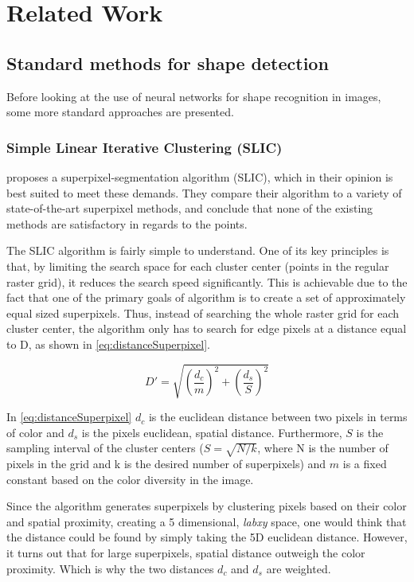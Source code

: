 \chapter{Related Work}

\section{Standard methods for shape detection}
Before looking at the use of neural networks for shape recognition in images, some more standard approaches are presented.

\subsection{Simple Linear Iterative Clustering (SLIC)}
\cite{Achanta2012} proposes a superpixel-segmentation algorithm (SLIC), which in their opinion is best suited to meet these demands. They compare their algorithm to a variety of state-of-the-art superpixel methods, and conclude that none of the existing methods are satisfactory in regards to the points.

The SLIC algorithm is fairly simple to understand. One of its key principles is that, by limiting the search space for each cluster center (points in the regular raster grid), it reduces the search speed significantly. This is achievable due to the fact that one of the primary goals of algorithm is to create a set of approximately equal sized superpixels. Thus, instead of searching the whole raster grid for each cluster center, the algorithm only has to search for edge pixels at a distance equal to D, as shown in \autoref{eq:distanceSuperpixel}.

\begin{equation}
	D'=\sqrt{\left(\frac{d_{c}}{m}\right)^{2} + \left(\frac{d_{s}}{S}\right)^{2}}
	\label{eq:distanceSuperpixel}
\end{equation}

In \autoref{eq:distanceSuperpixel} $d_{c}$ is the euclidean distance between two pixels in terms of color and $d_{s}$ is the pixels euclidean, spatial distance. Furthermore, $S$ is the sampling interval of the cluster centers ($S = \sqrt{N/k}$, where N is the number of pixels in the grid and k is the desired number of superpixels) and $m$ is a fixed constant based on the color diversity in the image.

Since the algorithm generates superpixels by clustering pixels based on their color and spatial proximity, creating a 5 dimensional, \textit{labxy} space, one would think that the distance could be found by simply taking the 5D euclidean distance. However, it turns out that for large superpixels, spatial distance outweigh the color proximity. Which is why the two distances $d_{c}$ and $d_{s}$ are weighted.

